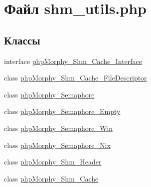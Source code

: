 \hypertarget{shm__utils_8php}{
\section{Файл shm\_\-utils.php}
\label{shm__utils_8php}
}
\subsection*{Классы}
\begin{DoxyCompactItemize}
\item 
interface \hyperlink{interfacephpMorphy__Shm__Cache__Interface}{phpMorphy\_\-Shm\_\-Cache\_\-Interface}
\item 
class \hyperlink{classphpMorphy__Shm__Cache__FileDescriptor}{phpMorphy\_\-Shm\_\-Cache\_\-FileDescriptor}
\item 
class \hyperlink{classphpMorphy__Semaphore}{phpMorphy\_\-Semaphore}
\item 
class \hyperlink{classphpMorphy__Semaphore__Empty}{phpMorphy\_\-Semaphore\_\-Empty}
\item 
class \hyperlink{classphpMorphy__Semaphore__Win}{phpMorphy\_\-Semaphore\_\-Win}
\item 
class \hyperlink{classphpMorphy__Semaphore__Nix}{phpMorphy\_\-Semaphore\_\-Nix}
\item 
class \hyperlink{classphpMorphy__Shm__Header}{phpMorphy\_\-Shm\_\-Header}
\item 
class \hyperlink{classphpMorphy__Shm__Cache}{phpMorphy\_\-Shm\_\-Cache}
\end{DoxyCompactItemize}
